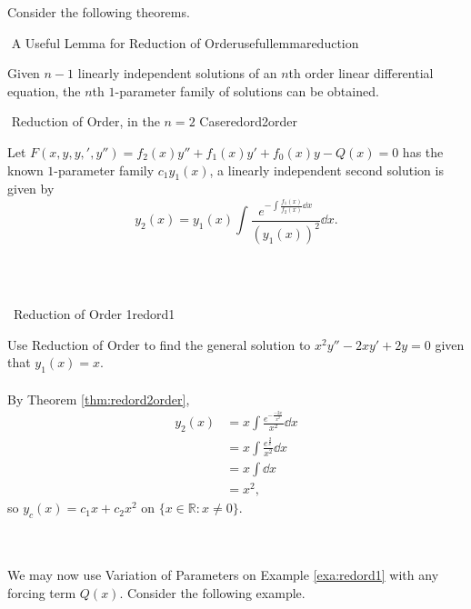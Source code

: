         Consider the following theorems.
        \begin{theorem}{\Stop\,\,A Useful Lemma for Reduction of Order}{usefullemmareduction}

            Given \(n-1\) linearly independent solutions of an \(n\)th order linear differential equation, the \(n\)th \(1\)-parameter family of solutions can be obtained.
            
        \end{theorem}
        \begin{theorem}{\Stop\,\,Reduction of Order, in the \(n=2\) Case}{redord2order}

            Let \(F(x,y,y,',y'')=f_2(x)y''+f_1(x)y'+f_0(x)y-Q(x)=0\) has the known \(1\)-parameter family \(c_1y_1(x)\), a linearly independent second solution is given by
            \begin{equation*}
                y_2(x)=y_1(x)\int \frac{e^{-\int \frac{f_1(x)}{f_2(x)}\dd x}}{(y_1(x))^2} \dd x.
            \end{equation*}
            
        \end{theorem}
        \vphantom
        \\
        \\
        \begin{example}{\Difficulty\,\Difficulty\,\,Reduction of Order 1}{redord1}

            Use Reduction of Order to find the general solution to \(x^2y''-2xy'+2y=0\) given that \(y_1(x)=x\).
            \\
            \\
            By Theorem \ref{thm:redord2order},
            \begin{align*}
                y_2(x)&=x\int \frac{e^{-\frac{-2x}{x^2}}}{x^2}\dd x \\
                &=x\int \frac{e^{\frac{2}{x}}}{x^2} \dd x \\
                &=x\int \dd x \\
                &=x^2,
            \end{align*}
            so \(y_c(x)=c_1x+c_2x^2\) on \(\{x\in\mathbb{R}:x\neq0\}\).
            
        \end{example}
        \pagebreak
        \vphantom
        \\
        \\
        We may now use Variation of Parameters on Example \ref{exa:redord1} with any forcing term \(Q(x)\). Consider the following example.
